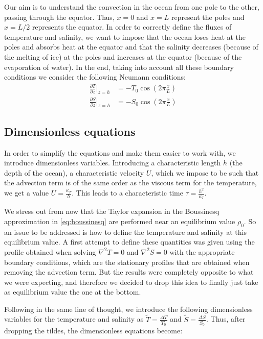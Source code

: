 \documentclass{article}
\begin{document}
Our aim is to understand the convection in the ocean from one pole to the other, passing through the equator. Thus, $x=0$ and $x=L$ represent the poles and $x=L/2$ represents the equator.
In order to correctly define the fluxes of temperature and salinity, we want to impose that the ocean loses heat at the poles and absorbs heat at the equator and that the salinity decreases (because of the melting of ice) at the poles and increases at the equator (because of the evaporation of water). In the end, taking into account all these boundary conditions we consider the following Neumann conditions:
\begin{equation}
  \begin{aligned}
    \frac{\partial T}{\partial z}\bigg|_{z = h} & = -T_0\cos(2\pi \frac{x}{L}) \\
    \frac{\partial S}{\partial z}\bigg|_{z = h} & = -S_0\cos(2\pi \frac{x}{L})
  \end{aligned}
\end{equation}


\subsection{Dimensionless equations}
In order to simplify the equations and make them easier to work with, we introduce dimensionless variables. Introducing a characteristic length $h$ (the depth of the ocean), a characteristic velocity $U$, which we impose to be such that the advection term is of the same order as the viscous term for the temperature, we get a value $U=\frac{\kappa_T}{h}$. This leads to a characteristic time $\tau = \frac{h^2}{\kappa_T}$.

We stress out from now that the Taylor expansion in the Boussinesq approximation in \cref{eq:boussinesq} are performed near an equilibrium value $\rho_0$. So an issue to be addressed is how to define the temperature and salinity at this equilibrium value. A first attempt to define these quantities was given using the profile obtained when solving $\nabla^2T = 0$ and $\nabla^2S=0$ with the appropriate boundary conditions, which are the stationary profiles that are obtained when removing the advection term. But the results were completely opposite to what we were expecting, and therefore we decided to drop this idea to finally just take as equilibrium value the one at the bottom.

Following in the same line of thought, we introduce the following dimensionless variables for the temperature and salinity as $\tilde{T} = \frac{\Delta T}{T_0}$ and $\tilde{S} = \frac{\Delta S}{S_0}$. Thus, after dropping the tildes, the dimensionless equations become:
\end{document}
